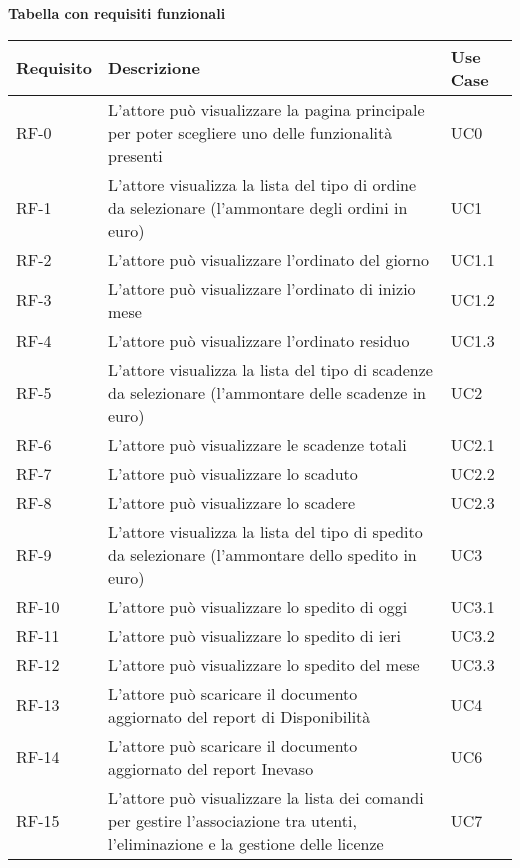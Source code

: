 \clearpage
\begin{table}
\begin{center}
\textbf{Tabella con requisiti funzionali}
\end{center}

\label{tab:requisiti-qualitativi}
\begin{tabular}{ |p{2cm}|p{8cm}|p{2cm}| }
 \hline
\textbf{ Requisito}   &  \textbf{Descrizione}    &  \textbf{    Use Case} \\ 
 \hline
  RF-0 &   L'attore può visualizzare la pagina principale per poter scegliere uno delle funzionalità presenti   & UC0 \\
 \hline
RF-1 &   L'attore visualizza la lista del tipo di ordine da selezionare (l'ammontare degli ordini in euro)  & UC1 \\
 \hline
 RF-2 & L'attore può visualizzare l'ordinato del giorno & UC1.1 \\
\hline
RF-3 & L'attore può visualizzare l'ordinato di inizio mese & UC1.2 \\
\hline
RF-4  &  L'attore può visualizzare l'ordinato residuo  & UC1.3 \\
\hline  
RF-5  & L'attore visualizza la lista del tipo di scadenze da selezionare  (l'ammontare delle scadenze in euro)  & UC2 \\
\hline
RF-6   & L'attore può visualizzare le scadenze totali   & UC2.1 \\
\hline
RF-7  &  L'attore può visualizzare lo scaduto & UC2.2 \\
\hline
RF-8   &  L'attore può visualizzare lo scadere & UC2.3 \\
\hline
RF-9   &  L'attore visualizza la lista del tipo di spedito da selezionare  (l'ammontare dello spedito in euro) & UC3 \\
 \hline
 RF-10   &  L'attore può visualizzare lo spedito di oggi & UC3.1 \\
  \hline
  RF-11   &  L'attore può visualizzare lo spedito di ieri & UC3.2 \\
   \hline
   RF-12  & L'attore può visualizzare lo spedito del mese  & UC3.3 \\
   \hline
   RF-13  &  L'attore può scaricare il documento aggiornato del report di Disponibilità & UC4 \\
   \hline
   RF-14  & L'attore può scaricare il documento aggiornato del report Inevaso   & UC6 \\
   \hline
RF-15    &  L'attore può visualizzare la lista dei comandi per gestire l'associazione tra utenti, l'eliminazione e la gestione delle licenze & UC7 \\

\end{tabular}
\end{table}
